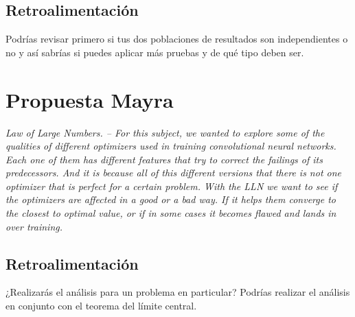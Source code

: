 \documentclass[12pt]{article}
\begin{document}
\subsection{Retroalimentación}

Podrías revisar primero si tus dos poblaciones de resultados son independientes o no y así sabrías si puedes aplicar más pruebas y de qué tipo deben ser.

\section{Propuesta Mayra}
{\em Law of Large Numbers. -- For this subject, we wanted to explore some of the qualities of different optimizers used in training convolutional neural networks. Each one of them has different features that try to correct the failings of its predecessors. And it is because all of this different versions that there is not one optimizer that is perfect for a certain problem. With the LLN we want to see if the optimizers are affected in a good or a bad way. If it helps them converge to the closest to optimal value, or if in some cases it becomes flawed and lands in over training.}

\subsection{Retroalimentación}

¿Realizarás el análisis para un problema en particular? Podrías realizar el análisis en conjunto con el teorema del límite central.

	


\end{document}
